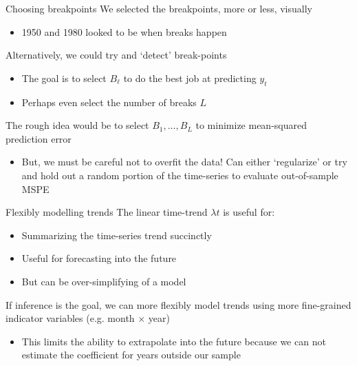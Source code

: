 \documentclass[aspectratio=169,t,11pt,table]{beamer}
\begin{document}
\begin{frame}{Choosing breakpoints}
  We selected the breakpoints, more or less, visually
  \begin{itemize}
    \item 1950 and 1980 looked to be when breaks happen
  \end{itemize}

  \pause
  \bigskip
  Alternatively, we could try and `detect' break-points
  \begin{itemize}
    \item The goal is to select $B_\ell$ to do the best job at predicting $y_t$
    \item Perhaps even select the number of breaks $L$
  \end{itemize}

  \pause
  \bigskip
  The rough idea would be to select $B_1, \dots, B_L$ to minimize mean-squared prediction error
  \begin{itemize}
    \item But, we must be careful not to overfit the data! Can either `regularize' or try and hold out a random portion of the time-series to evaluate out-of-sample MSPE
  \end{itemize} 
\end{frame}




\begin{frame}{Flexibly modelling trends}
  The linear time-trend $\lambda t$ is useful for:
  \begin{itemize}
    \item Summarizing the time-series trend succinctly
    
    \item Useful for forecasting into the future

    \item But can be over-simplifying of a model
  \end{itemize}

  \bigskip
  If inference is the goal, we can more flexibly model trends using more fine-grained indicator variables (e.g. month $\times$ year)
  \begin{itemize}
    \item This limits the ability to extrapolate into the future because we can not estimate the coefficient for years outside our sample
  \end{itemize}
\end{frame}
\end{document}
